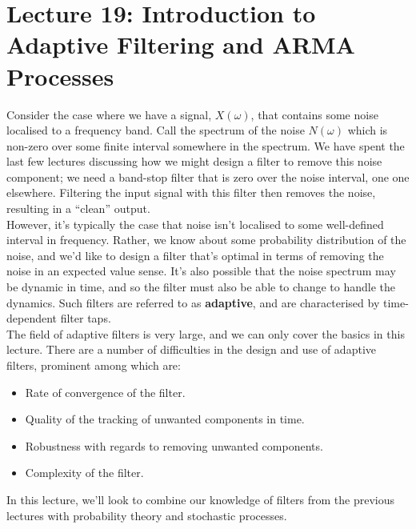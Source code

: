 \section{Lecture 19: Introduction to Adaptive Filtering and ARMA Processes}

Consider the case where we have a signal, $X(\omega)$, that contains some
noise localised to a frequency band. Call the spectrum of the noise
$N(\omega)$ which is non-zero over some finite interval somewhere
in the spectrum. We have spent the last few lectures discussing how
we might design a filter to remove this noise component; we need
a band-stop filter that is zero over the noise interval, one one
elsewhere. Filtering the input signal with this filter then removes
the noise, resulting in a ``clean'' output.\\
%
However, it's typically the case that noise isn't localised to some
well-defined interval in frequency. Rather, we know about some
probability distribution of the noise, and we'd like to design a filter
that's optimal in terms of removing the noise in an expected value
sense. It's also possible that the noise spectrum may be dynamic in
time, and so the filter must also be able to change to handle the
dynamics. Such filters are referred to as \textbf{adaptive}, and
are characterised by time-dependent filter taps.\\
%
The field of adaptive filters is very large, and we can only cover
the basics in this lecture. There are a number of difficulties in
the design and use of adaptive filters, prominent among which are:
%
\begin{itemize}
\item Rate of convergence of the filter.
\item Quality of the tracking of unwanted components in time.
\item Robustness with regards to removing unwanted components.
\item Complexity of the filter.
\end{itemize}
%
In this lecture, we'll look to combine our knowledge of filters from
the previous lectures with probability theory and stochastic processes.\\

